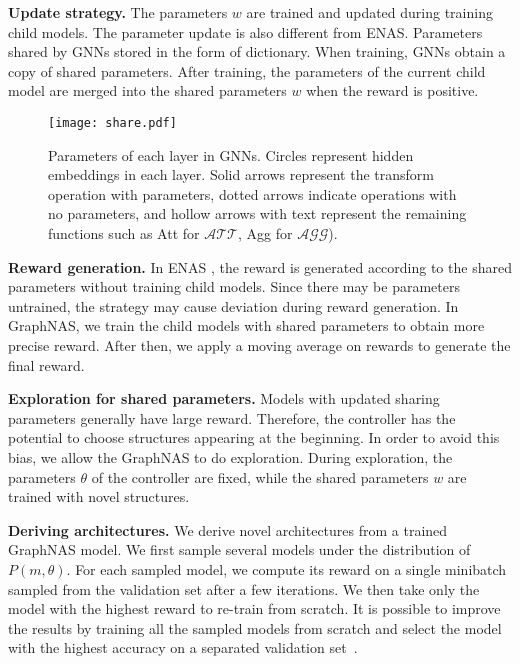 \documentclass{article}
\begin{document}
\textbf{Update strategy.}  The parameters $w$ are trained and updated during training child models. The parameter update is also different from ENAS.  Parameters shared by GNNs stored in the form of dictionary. When training, GNNs obtain a copy of shared parameters. After training, the parameters of the current child model are merged into the shared parameters $w$ when the reward is positive.





\label{Parameters share}
\begin{figure}
	\texttt{[image: share.pdf]}
	\caption{Parameters of each layer in GNNs. Circles represent hidden embeddings in each layer. Solid arrows represent the transform operation with parameters, dotted arrows indicate operations with no parameters, and hollow arrows with text represent the remaining functions such as Att for $\mathcal{ATT}$, Agg for $\mathcal{AGG}$).}
	\label{fig:parametersharing}
\end{figure}




\textbf{Reward generation.}
In ENAS \cite{ENAS}, the reward is generated according to the shared parameters without training child models.
Since there may be parameters untrained, the strategy may cause deviation during reward generation. In GraphNAS, we train the child models with shared parameters to obtain more precise reward. After then, we apply a moving average on rewards to generate the final reward.

\textbf{Exploration for shared parameters.}
Models with updated sharing parameters generally have large reward. Therefore, the controller has the potential to choose structures appearing at the beginning.
In order to avoid this bias, we allow the GraphNAS to do exploration. During exploration, the parameters $\theta$ of the controller are fixed, while the shared parameters $w$ are trained with novel structures.

\textbf{Deriving architectures.}
We derive novel architectures from a trained GraphNAS model. We first sample several models under the distribution of $P(m,\theta)$. For each sampled model, we compute its reward on a single minibatch sampled from the validation set after a few iterations. We then take only the model with the highest reward to re-train from scratch. It is possible to improve the results by training all the sampled models from scratch and select the model with the highest accuracy on a separated validation set~\cite{NAS,Zoph2018LearningTA}.
\end{document}
